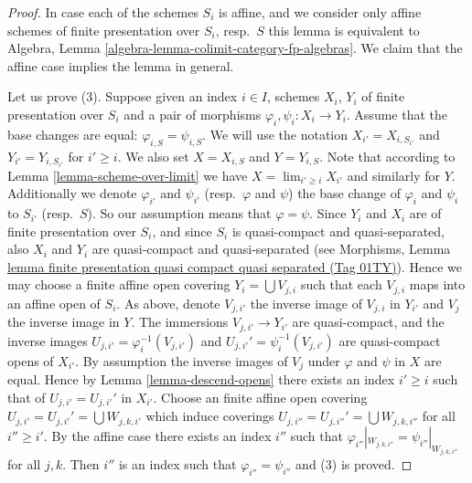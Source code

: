 \documentclass{amsart}
\theoremstyle{plain}
\theoremstyle{definition}
\theoremstyle{remark}
\numberwithin{equation}{subsection}
\def\lim{\mathop{\mathrm{lim}}\nolimits}
\begin{document}
\begin{proof}
In case each of the schemes $S_i$ is affine, and we consider
only affine schemes of finite presentation over $S_i$, resp.\ $S$
this lemma is equivalent to
Algebra, Lemma \ref{algebra-lemma-colimit-category-fp-algebras}.
We claim that the affine case implies the lemma in general.

\medskip\noindent
Let us prove (3). Suppose given an index $i \in I$, schemes
$X_i$, $Y_i$ of finite presentation over $S_i$ and a pair of morphisms
$\varphi_i, \psi_i : X_i \to Y_i$. Assume that the base changes are
equal: $\varphi_{i, S} = \psi_{i, S}$. We will use the notation
$X_{i'} = X_{i, S_{i'}}$ and $Y_{i'} = Y_{i, S_{i'}}$ for
$i' \geq i$. We also set $X = X_{i, S}$ and $Y = Y_{i, S}$.
Note that according to Lemma \ref{lemma-scheme-over-limit} we have
$X = \lim_{i' \geq i} X_{i'}$ and similarly for $Y$.
Additionally we denote $\varphi_{i'}$ and $\psi_{i'}$
(resp.\ $\varphi$ and $\psi$)
the base change of $\varphi_i$ and $\psi_i$ to $S_{i'}$
(resp.\ $S$). So our assumption means that $\varphi = \psi$.
Since $Y_i$ and $X_i$ are of finite presentation
over $S_i$, and since $S_i$ is quasi-compact and quasi-separated, also
$X_i$ and $Y_i$ are quasi-compact and quasi-separated
(see Morphisms,
Lemma \href{https://stacks.math.columbia.edu/tag/01TY}{lemma finite presentation quasi compact quasi separated (Tag 01TY)}).
Hence we may choose a finite affine open covering
$Y_i = \bigcup V_{j, i}$ such that each $V_{j, i}$ maps into
an affine open of $S_i$. As above, denote $V_{j, i'}$ the inverse
image of $V_{j, i}$ in $Y_{i'}$ and $V_j$ the inverse image in $Y$.
The immersions $V_{j, i'} \to Y_{i'}$ are quasi-compact, and the inverse images
$U_{j, i'} = \varphi_i^{-1}(V_{j, i'})$ and
$U_{j, i'}' = \psi_i^{-1}(V_{j, i'})$
are quasi-compact opens of $X_{i'}$. By assumption the inverse images of
$V_j$ under $\varphi$ and $\psi$ in $X$ are equal.
Hence by Lemma \ref{lemma-descend-opens}
there exists an index $i' \geq i$ such that
of $U_{j, i'} = U_{j, i'}'$ in $X_{i'}$.
Choose an finite affine open covering
$U_{j, i'} = U_{j, i'}' = \bigcup W_{j, k, i'}$
which induce coverings $U_{j, i''} = U_{j, i''}' = \bigcup W_{j, k, i''}$
for all $i'' \geq i'$.
By the affine case there exists
an index $i''$ such that
$\varphi_{i''}|_{W_{j, k, i''}} = \psi_{i''}|_{W_{j, k, i''}}$
for all $j, k$. Then $i''$ is an index such that
$\varphi_{i''} = \psi_{i''}$ and (3) is proved.


\end{proof}
\end{document}
